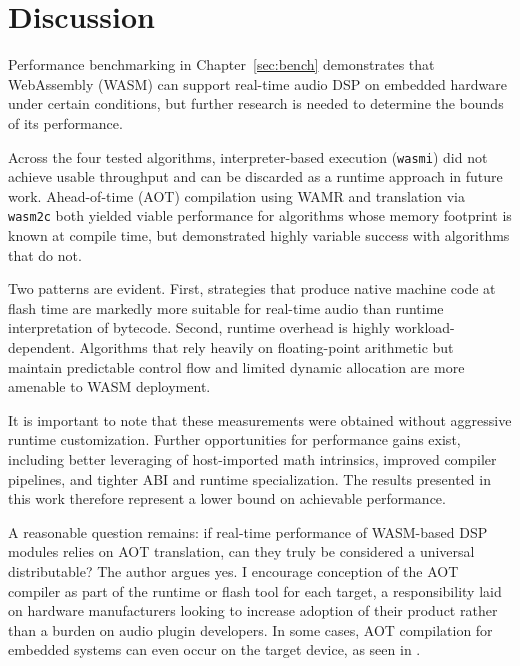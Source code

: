 \chapter{ Discussion }


Performance benchmarking in Chapter~\ref{sec:bench} demonstrates that WebAssembly (WASM) can support real-time audio DSP on embedded hardware under certain conditions, but further research is needed to determine the bounds of its performance.

Across the four tested algorithms, interpreter-based execution (\lstinline{wasmi}) did not achieve usable throughput and can be discarded as a runtime approach in future work. Ahead-of-time (AOT) compilation using WAMR and translation via \lstinline{wasm2c} both yielded viable performance for algorithms whose memory footprint is known at compile time, but demonstrated highly variable success with algorithms that do not.

Two patterns are evident. First, strategies that produce native machine code at flash time are markedly more suitable for real-time audio than runtime interpretation of bytecode. Second, runtime overhead is highly workload-dependent. Algorithms that rely heavily on floating-point arithmetic but maintain predictable control flow and limited dynamic allocation are more amenable to WASM deployment.

It is important to note that these measurements were obtained without aggressive runtime customization. Further opportunities for performance gains exist, including better leveraging of host-imported math intrinsics, improved compiler pipelines, and tighter ABI and runtime specialization. The results presented in this work therefore represent a lower bound on achievable performance.


A reasonable question remains: if real-time performance of WASM-based DSP modules relies on AOT translation, can they truly be considered a universal distributable? The author argues yes. I encourage conception of the AOT compiler as part of the runtime or flash tool for each target, a responsibility laid on hardware manufacturers looking to increase adoption of their product rather than a burden on audio plugin developers. In some cases, AOT compilation for embedded systems can even occur on the target device, as seen in \cite{10756513}.



